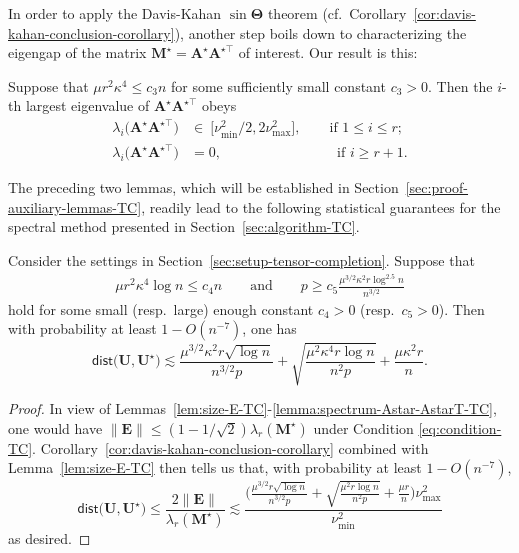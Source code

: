 In order to apply the Davis-Kahan $\sin\bm{\Theta}$ theorem (cf.~Corollary~\ref{cor:davis-kahan-conclusion-corollary}), another step boils down to characterizing the eigengap of the matrix $\bm{M}^{\star}=\bm{A}^{\star}\bm{A}^{\star\top}$ of interest. Our result is this:
%
\begin{lemma}
	\label{lemma:spectrum-Astar-AstarT-TC}
	Suppose that $\mu r^{2}\kappa^{4}\leq c_{3}n$ for some sufficiently small constant $c_3>0$. Then the $i$-th largest eigenvalue of $\bm{A}^{\star}\bm{A}^{\star\top}$ obeys
	\begin{align*}
		\lambda_{i}\big(\bm{A}^{\star}\bm{A}^{\star\top}\big) & \in\ \big[\nu_{\min}^{2}/2, 2\nu_{\max}^2 \big], \qquad \text{if }1\leq i\leq r; \\
		\lambda_{i}\big(\bm{A}^{\star}\bm{A}^{\star\top}\big) & =0,\qquad\qquad\qquad\qquad ~\text{if }i\geq r+1.
	\end{align*}
\end{lemma}
%
The preceding two lemmas, which will be established in Section~\ref{sec:proof-auxiliary-lemmas-TC}, readily lead to the following statistical guarantees for the spectral method presented in Section~\ref{sec:algorithm-TC}.
%
\begin{theorem}
	\label{thm:performance-TC-l2}
	Consider the settings in Section~\ref{sec:setup-tensor-completion}. Suppose that
	\begin{align}
			\mu r^{2}\kappa^{4}\log n \leq c_4 n
			\qquad \text{and} \qquad
			p\geq c_{5} \frac{\mu^{3/2}\kappa^{2}r \log^{2.5} n} {n^{3/2}}
			\label{eq:condition-TC}
	\end{align}
	hold for some small (resp.~large) enough constant $c_4>0$ (resp.~$c_5>0$). Then with probability at least $1-O(n^{-7})$, one has
	\[
		\mathsf{dist}\big(\bm{U},\bm{U}^{\star}\big)
		\lesssim \frac{\mu^{3/2}\kappa^{2}r\sqrt{\log n}}{n^{3/2}p}+\sqrt{\frac{\mu^{2}\kappa^{4}r\log n}{n^{2}p}}+\frac{\mu\kappa^{2}r}{n} .
	\]
\end{theorem}
%
\begin{proof}
In view of Lemmas~\ref{lem:size-E-TC}-\ref{lemma:spectrum-Astar-AstarT-TC}, one would have $\|\bm{E}\|\leq (1-1/\sqrt{2}) \lambda_{r} (\bm{M}^{\star} )$ under Condition \eqref{eq:condition-TC}.
%
%
%
Corollary~\ref{cor:davis-kahan-conclusion-corollary} combined with Lemma~\ref{lem:size-E-TC} then tells us that, with probability at least $1-O(n^{-7})$,
%
\[
	\mathsf{dist}\big(\bm{U},\bm{U}^{\star}\big)
	\leq \frac{2\big\|\bm{E}\big\|}{\lambda_{r}(\bm{M}^{\star})}\lesssim\frac{\Big(\frac{\mu^{3/2}r\sqrt{\log n}}{n^{3/2}p}+\sqrt{\frac{\mu^{2}r\log n}{n^{2}p}}+\frac{\mu r}{n}\Big)\nu_{\max}^{2}}{\nu_{\min}^{2}}
\]
%
as desired. \end{proof}



